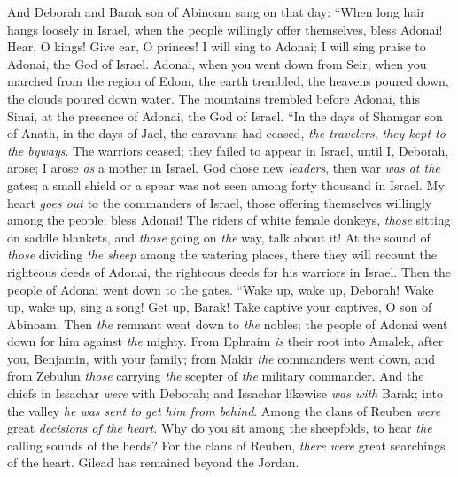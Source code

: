 \begin{biblechapter} %
 And Deborah and Barak son of Abinoam sang on that day:
\verse “When long hair hangs loosely in Israel, 
when the people willingly offer themselves, 
bless Adonai!
\verse Hear, O kings! Give ear, O princes! 
I will sing to Adonai; 
I will sing praise to Adonai, 
the God of Israel.
\verse Adonai, when you went down from Seir, 
when you marched from the region of Edom, 
the earth trembled, the heavens poured down, 
the clouds poured down water.
\verse The mountains trembled before Adonai, 
this Sinai, at the presence of Adonai, the God of Israel.
\verse “In the days of Shamgar son of Anath, 
in the days of Jael, the caravans had ceased, 
\textit{the travelers}, \textit{they kept to the byways}.
\verse The warriors ceased; 
they failed to appear in Israel, 
until I, Deborah, arose; 
I arose \textit{as} a mother in Israel.
\verse God chose new \textit{leaders}, 
then war \textit{was at the} gates; 
a small shield or a spear was not seen 
among forty thousand in Israel.
\verse My heart \textit{goes out} to the commanders of Israel, 
those offering themselves willingly among the people; 
bless Adonai!
\verse The riders of white female donkeys, 
\textit{those} sitting on saddle blankets, 
and \textit{those} going on \textit{the} way, talk about it!
\verse At the sound of \textit{those} dividing \textit{the sheep} 
among the watering places, 
there they will recount the righteous deeds of Adonai, 
the righteous deeds for his warriors in Israel. 
Then the people of Adonai went down to the gates.
\verse “Wake up, wake up, Deborah! 
Wake up, wake up, sing a song! 
Get up, Barak! 
Take captive your captives, O son of Abinoam.
\verse Then \textit{the} remnant went down to \textit{the} nobles; 
the people of Adonai went down for him against \textit{the} mighty.
\verse From Ephraim \textit{is} their root into Amalek, 
after you, Benjamin, with your family; 
from Makir \textit{the} commanders went down, 
and from Zebulun \textit{those} carrying \textit{the} scepter 
of \textit{the} military commander.
\verse And the chiefs in Issachar \textit{were} with Deborah; 
and Issachar likewise \textit{was with} Barak; 
into the valley \textit{he was sent to get him from behind}. 
Among the clans of Reuben 
\textit{were} great \textit{decisions of the heart}.
\verse Why do you sit among the sheepfolds, 
to hear \textit{the} calling sounds of the herds? 
For the clans of Reuben, 
\textit{there were} great searchings of the heart.
\verse Gilead has remained beyond the Jordan. 

\end{biblechapter}
